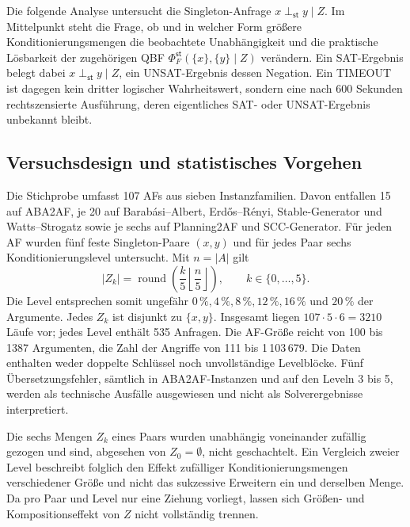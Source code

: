 Die folgende Analyse untersucht die Singleton-Anfrage
\(x\perp_{\mathsf{st}}y\mid Z\). Im Mittelpunkt steht die Frage, ob und in
welcher Form größere Konditionierungsmengen die beobachtete Unabhängigkeit
und die praktische Lösbarkeit der zugehörigen QBF
\(\Phi_F^{\mathsf{st}}(\{x\},\{y\}\mid Z)\) verändern. Ein SAT-Ergebnis
belegt dabei \(x\perp_{\mathsf{st}}y\mid Z\), ein UNSAT-Ergebnis dessen
Negation. Ein TIMEOUT ist dagegen kein dritter logischer Wahrheitswert,
sondern eine nach 600 Sekunden rechtszensierte Ausführung, deren eigentliches
SAT- oder UNSAT-Ergebnis unbekannt bleibt.

\subsection{Versuchsdesign und statistisches Vorgehen}
\label{subsec:empirical-stable-z-method}

Die Stichprobe umfasst 107 AFs aus sieben Instanzfamilien. Davon entfallen
15 auf ABA2AF, je 20 auf Barabási--Albert, Erdős--Rényi, Stable-Generator
und Watts--Strogatz sowie je sechs auf Planning2AF und SCC-Generator. Für
jeden AF wurden fünf feste Singleton-Paare \((x,y)\) und für jedes Paar sechs
Konditionierungslevel untersucht. Mit \(n=|A|\) gilt
\begin{equation}
    |Z_k|
    = \operatorname{round}\!\left(
        \frac{k}{5}\left\lfloor\frac{n}{5}\right\rfloor
      \right),
    \qquad k\in\{0,\ldots,5\}.
    \label{eq:empirical-stable-z-levels}
\end{equation}
Die Level entsprechen somit ungefähr \(0\,\%,4\,\%,8\,\%,12\,\%,16\,\%\)
und \(20\,\%\) der Argumente. Jedes \(Z_k\) ist disjunkt zu
\(\{x,y\}\). Insgesamt liegen \(107\cdot5\cdot6=3210\) Läufe vor; jedes
Level enthält 535 Anfragen. Die AF-Größe reicht von 100 bis 1387 Argumenten,
die Zahl der Angriffe von 111 bis 1\,103\,679. Die Daten enthalten weder
doppelte Schlüssel noch unvollständige Levelblöcke. Fünf
Übersetzungsfehler, sämtlich in ABA2AF-Instanzen und auf den Leveln 3 bis 5,
werden als technische Ausfälle ausgewiesen und nicht als Solverergebnisse
interpretiert.

Die sechs Mengen \(Z_k\) eines Paars wurden unabhängig voneinander zufällig
gezogen und sind, abgesehen von \(Z_0=\emptyset\), nicht geschachtelt. Ein
Vergleich zweier Level beschreibt folglich den Effekt zufälliger
Konditionierungsmengen verschiedener Größe und nicht das sukzessive
Erweitern ein und derselben Menge. Da pro Paar und Level nur eine Ziehung
vorliegt, lassen sich Größen- und Kompositionseffekt von \(Z\) nicht
vollständig trennen.

